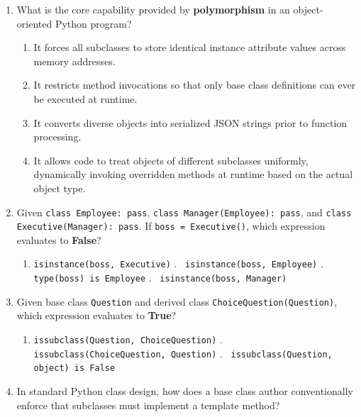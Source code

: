 \documentclass[11pt,a4paper]{article}
\begin{document}
\begin{enumerate}[label=\textbf{Q\arabic*.},leftmargin=2em,itemsep=1.5pt,topsep=1pt,resume]
\item What is the core capability provided by \textbf{polymorphism} in an object-oriented Python program?
\begin{enumerate}[label=\Alph*.,leftmargin=2em]
\item It forces all subclasses to store identical instance attribute values across memory addresses.
\item It restricts method invocations so that only base class definitions can ever be executed at runtime.
\item It converts diverse objects into serialized JSON strings prior to function processing.
\item It allows code to treat objects of different subclasses uniformly, dynamically invoking overridden methods at runtime based on the actual object type.
\end{enumerate}
\item Given \texttt{class Employee: pass}, \texttt{class Manager(Employee): pass}, and \texttt{class Executive(Manager): pass}. If \texttt{boss = Executive()}, which expression evaluates to \textbf{False}?
\begin{enumerate}[label=\Alph*.,leftmargin=2em]
\item \texttt{isinstance(boss, Executive)} \quad \Alph*.~ \texttt{isinstance(boss, Employee)} \quad \Alph*.~ \texttt{type(boss) is Employee} \quad \Alph*.~ \texttt{isinstance(boss, Manager)}
\end{enumerate}
\item Given base class \texttt{Question} and derived class \texttt{ChoiceQuestion(Question)}, which expression evaluates to \textbf{True}?
\begin{enumerate}[label=\Alph*.,leftmargin=2em]
\item \texttt{issubclass(Question, ChoiceQuestion)} \quad \Alph*.~ \texttt{issubclass(ChoiceQuestion, Question)} \quad \Alph*.~ \texttt{issubclass(Question, object) is False}
\end{enumerate}
\item In standard Python class design, how does a base class author conventionally enforce that subclasses must implement a template method?
\begin{enumerate}[label=\Alph*.,leftmargin=2em]

\end{enumerate}
\end{enumerate}
\end{document}
